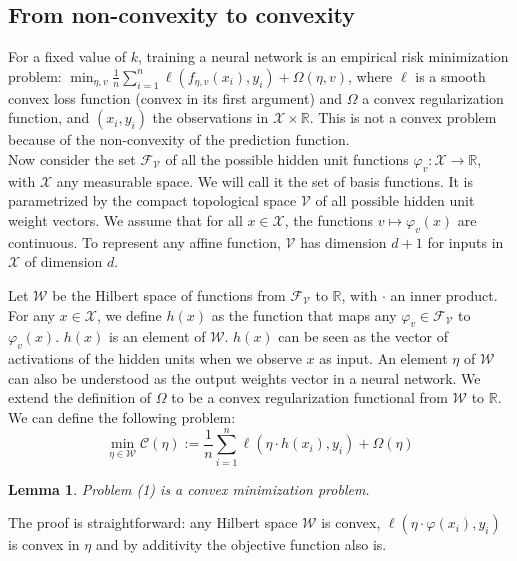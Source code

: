 \documentclass[a4paper, 11pt]{scrartcl}
\newtheorem{lemma}[theorem]{Lemma}
\begin{document}
\subsection{From non-convexity to convexity}

For a fixed value of $k$, training a neural network is an empirical risk minimization problem: $\min_{\eta, v} \frac{1}{n} \sum_{i=1}^n \ell(f_{\eta, v}(x_i), y_i) + \Omega(\eta, v)$, where $\ell$ is a smooth convex loss function (convex in its first argument) and $\Omega$ a convex regularization function, and $(x_i, y_i)$ the observations in $\mathcal{X} \times \mathbb{R}$. This is not a convex problem because of the non-convexity of the prediction function.\\

Now consider the set $\mathcal{F}_\mathcal{V}$ of all the possible hidden unit functions $\varphi_v : \mathcal{X} \rightarrow \mathbb{R}$, with $\mathcal{X}$ any measurable space. We will call it the set of basis functions. It is parametrized by the compact topological space $\mathcal{V}$ of all possible hidden unit weight vectors. We assume that for all $x \in \mathcal{X}$, the functions $v \mapsto \varphi_v(x)$ are continuous. To represent any affine function, $\mathcal{V}$ has dimension $d + 1$ for inputs in $\mathcal{X}$ of dimension $d$.

Let $\mathcal{W}$ be the Hilbert space of functions from $\mathcal{F}_\mathcal{V}$ to $\mathbb{R}$, with $\cdot$ an inner product. For any $x \in \mathcal{X}$, we define $h(x)$ as the function that maps any $\varphi_v \in \mathcal{F}_\mathcal{V}$ to $\varphi_v(x)$. $h(x)$ is an element of $\mathcal{W}$. $h(x)$ can be seen as the vector of activations of the hidden units when we observe $x$ as input. An element $\eta$ of $\mathcal{W}$ can also be understood as the output weights vector in a neural network. We extend the definition of $\Omega$ to be a convex regularization functional from $\mathcal{W}$ to $\mathbb{R}$.  \\

We can define the following problem:
\begin{equation}
\min_{\eta \in \mathcal{W}} \mathcal{C}(\eta) := \frac{1}{n} \sum_{i=1}^n \ell(\eta \cdot h(x_i), y_i) + \Omega(\eta)
\end{equation}

\begin{lemma}
Problem (1) is a convex minimization problem.
\end{lemma}
The proof is straightforward: any Hilbert space $\mathcal{W}$ is convex, $ \ell(\eta \cdot \varphi(x_i), y_i)$ is convex in $\eta$ and by additivity the objective function also is.\\
\end{document}

